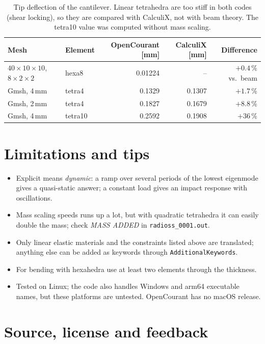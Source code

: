 \documentclass[11pt,a4paper]{article}
\begin{document}
\begin{table}[ht]
\centering\small
\begin{tabular}{@{}llrrr@{}}
\toprule
Mesh & Element & OpenCourant [mm] & CalculiX [mm] & Difference \\
\midrule
$40\times10\times10$, $8\times2\times2$ & hexa8 & 0.01224 & -- & $+0.4\,\%$ vs.\ beam \\
Gmsh, 4\,mm & tetra4  & 0.1329 & 0.1307 & $+1.7\,\%$ \\
Gmsh, 2\,mm & tetra4  & 0.1827 & 0.1679 & $+8.8\,\%$ \\
Gmsh, 4\,mm & tetra10 & 0.2592 & 0.1908 & $+36\,\%$ \\
\bottomrule
\end{tabular}
\caption{Tip deflection of the cantilever. Linear tetrahedra are too stiff in both codes
(shear locking), so they are compared with CalculiX, not with beam theory. The tetra10 value was
computed without mass scaling.}
\label{tab:beam}
\end{table}

\section{Limitations and tips}

\begin{itemize}
  \item Explicit means \emph{dynamic}: a ramp over several periods of the lowest eigenmode gives a
        quasi-static answer; a constant load gives an impact response with oscillations.
  \item Mass scaling speeds runs up a lot, but with quadratic tetrahedra it can easily double the
        mass; check \emph{MASS ADDED} in \texttt{radioss\_0001.out}.
  \item Only linear elastic materials and the constraints listed above are translated; anything
        else can be added as keywords through \texttt{AdditionalKeywords}.
  \item For bending with hexahedra use at least two elements through the thickness.
  \item Tested on Linux; the code also handles Windows and arm64 executable names, but these
        platforms are untested. OpenCourant has no macOS release.
\end{itemize}

\section{Source, license and feedback}
\end{document}
